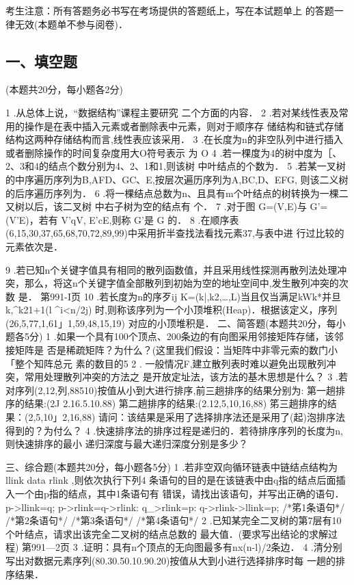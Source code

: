 

考生注意：所有答题务必书写在考场提供的答题纸上，写在本试题单上 的答题一律无效(本题单不参与阅卷)．

\subsection{一、填空题}
(本题共20分，每小题各2分)


1	.从总体上说，“数据结构”课程主要研究 二个方面的内容．
2	.若对某线性表及常用的操作是在表中插入元素或者删除表中元素，则对于顺序存 储结构和链式存储结构这两种存储结构而言,线性表应该采用．
3	.在长度为n的非空队列中进行插入或者删除操作的时间复杂度用大O符号表示
为 O
4	.若一棵度为4的树中度为［、2、3和4的结点个数分别为4、2、1和1,则该树 中叶结点的个数为．
5	.若某一叉树的中序遍历序列为B,AFD、GC、E,按层次遍历序列为A,BC,D、EFG,
则该二义树的后序遍历序列为．
6	.将一棵结点总数为n、且具有m个叶结点的树转换为一棵二又树以后，该二叉树 中右子树为空的结点有 个．
7	.对于图 G=(V,E)与 G'=(V'E)，若有 V'qV, E'cE,则称 G'是 G 的．
8	.在顺序表(6,15,30,37,65,68,70,72,89,99)中采用折半查找法看找元素37,与表中进
行过比较的元素依次是．

9	.若已知n个关键字值具有相同的散列函数值，并且采用线性探测再散列法处理冲 突，那么，将这n个关键字值全部散列到初始为空的地址空间中,发生散列冲突的次数 是．
第991-I页
10	.若长度为n的序歹ij K=(k|,k2,…,L)当且仅当满足kWk*并旦k,^k21+1(l ^i<n/2j) 时,则称该序列为一个小顶堆积(Heap)．根据该定义，序列(26,5,77,1,61」1,59,48,15,19) 对应的小顶堆积是．
二、简答题(本题共20分，每小题各5分)
1	.如果一个具有100个顶点、200条边的有向图采用邻接矩阵存储，该邻接矩阵是 否是稀疏矩阵？为什么？(这里我们假设：当矩阵中非零元索的数门小「整个知阵总元 素的数目的5%
2	. 一般情况F,建立散列表时难以避免出现散列冲突，常用处理散列冲突的方法之 是开放定址法，该方法的基木思想是什么？
3	.若对序列(2,12,列,88510)按值从小到大进行排序,前三趟排序的结果分别为:
第一趟排序的结果:(2J 2.16.5.10.88)
第二趟排序的结果:(2.12,5,10,16,88)
笫三趟排序的结果：(2,5,10」2,16,88)
请问：该结果是采用了选择排序法还是采用了(起)泡排序法得到的？为付么？
4	.快速排序法的排序过程是递归的．若待排序序列的长度为n,则快速排序的最小 递归深度与最大递归深度分别是多少？

三、综合题(本题共20分，每小题各5分)
1	.若非空双向循环链表中链结点结构为llink data rlink ,则依次执行下列4
条语句的目的是在该链表中由q指的结点后面插入一个由p指的结点，其中1条语句有
错误，请找出该语句，并写出正确的语句．
p->llink=q;
p->rlink=q->rlink: q_>rlink=p: q->rlink->llink=p;
/*笫1条语句*/ /*第2条语句*/ /*第3条语句*/ /*第4条语句*/
2	.已知某完全二叉树的第7层有10个叶结点，请求出该完全二叉树的结点总数的 最大值．(要求写出结论的求解过程)
第991—2页
3	.证明：具有n个顶点的无向图最多有nx(n-l)/2条边．
4	.清分别写出对数据元素序列(80.30.50.10.90.20)按值从大到小进行选择排序时每
一趟的排序结果．

